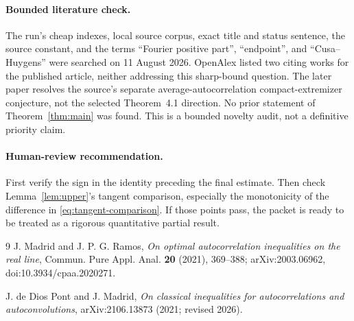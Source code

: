 \documentclass[11pt]{article}
\begin{document}
\paragraph{Bounded literature check.}
The run's cheap indexes, local source corpus, exact title and status sentence,
the source constant, and the terms ``Fourier positive part'', ``endpoint'',
and ``Cusa--Huygens'' were searched on 11 August 2026. OpenAlex listed two
citing works for the published article, neither addressing this sharp-bound
question. The later paper \cite{DeDiosMadrid} resolves the source's separate
average-autocorrelation compact-extremizer conjecture, not the selected
Theorem~4.1 direction. No prior statement of Theorem~\ref{thm:main} was found.
This is a bounded novelty audit, not a definitive priority claim.

\paragraph{Human-review recommendation.}
First verify the sign in the identity preceding the final estimate. Then
check Lemma~\ref{lem:upper}'s tangent comparison, especially the monotonicity
of the difference in \eqref{eq:tangent-comparison}. If those points pass, the
packet is ready to be treated as a rigorous quantitative partial result.

\begin{thebibliography}{9}
J. Madrid and J. P. G. Ramos,
\emph{On optimal autocorrelation inequalities on the real line},
Commun. Pure Appl. Anal. \textbf{20} (2021), 369--388;
arXiv:2003.06962, doi:10.3934/cpaa.2020271.

J. de Dios Pont and J. Madrid,
\emph{On classical inequalities for autocorrelations and autoconvolutions},
arXiv:2106.13873 (2021; revised 2026).
\end{thebibliography}
\end{document}
